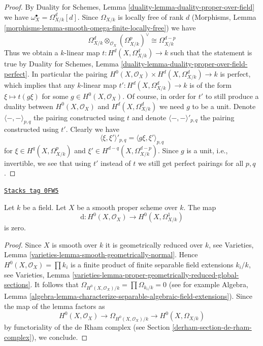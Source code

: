 \begin{proof}
By Duality for Schemes, Lemma \ref{duality-lemma-duality-proper-over-field}
we have $\omega_X^\bullet = \Omega^d_{X/k}[d]$.
Since $\Omega_{X/k}$ is locally free of rank $d$
(Morphisms, Lemma \ref{morphisms-lemma-smooth-omega-finite-locally-free})
we have
$$
\Omega^d_{X/k} \otimes_{\mathcal{O}_X} (\Omega^p_{X/k})^\vee
\cong
\Omega^{d - p}_{X/k}
$$
Thus we obtain a $k$-linear map $t : H^d(X, \Omega^d_{X/k}) \to k$
such that the statement is true by Duality for Schemes, Lemma
\ref{duality-lemma-duality-proper-over-field-perfect}.
In particular the pairing
$H^0(X, \mathcal{O}_X) \times H^d(X, \Omega^d_{X/k}) \to k$
is perfect, which implies that any $k$-linear map
$t' : H^d(X, \Omega^d_{X/k}) \to k$ is of the form
$\xi \mapsto t(g\xi)$ for some $g \in H^0(X, \mathcal{O}_X)$.
Of course, in order for $t'$ to still produce a duality
between $H^0(X, \mathcal{O}_X)$ and $H^d(X, \Omega^d_{X/k})$
we need $g$ to be a unit. Denote $\langle -, - \rangle_{p, q}$
the pairing constructed using $t$ and denote $\langle -, - \rangle'_{p, q}$
the pairing constructed using $t'$. Clearly we have
$$
\langle \xi, \xi' \rangle'_{p, q} =
\langle g\xi, \xi' \rangle_{p, q}
$$
for $\xi \in H^q(X, \Omega^p_{X/k})$ and
$\xi' \in H^{d - q}(X, \Omega^{d - p}_{X/k})$. Since $g$ is a unit, i.e.,
invertible, we see that using $t'$ instead of $t$ we still get perfect
pairings for all $p, q$.
\end{proof}

\begin{lemma}
\label{derham-lemma-bottom-part-degenerates}
\href{https://stacks.math.columbia.edu/tag/0FW5}{\texttt{Stacks tag 0FW5}}

Let $k$ be a field. Let $X$ be a smooth proper scheme over $k$. The map
$$
\text{d} : H^0(X, \mathcal{O}_X) \to H^0(X, \Omega^1_{X/k})
$$
is zero.
\end{lemma}

\begin{proof}
Since $X$ is smooth over $k$ it is geometrically reduced over $k$, see
Varieties, Lemma \ref{varieties-lemma-smooth-geometrically-normal}.
Hence $H^0(X, \mathcal{O}_X) = \prod k_i$
is a finite product of finite separable
field extensions $k_i/k$, see Varieties, Lemma
\ref{varieties-lemma-proper-geometrically-reduced-global-sections}.
It follows that $\Omega_{H^0(X, \mathcal{O}_X)/k} = \prod \Omega_{k_i/k} = 0$
(see for example Algebra, Lemma
\ref{algebra-lemma-characterize-separable-algebraic-field-extensions}).
Since the map of the lemma factors as
$$
H^0(X, \mathcal{O}_X) \to
\Omega_{H^0(X, \mathcal{O}_X)/k} \to
H^0(X, \Omega_{X/k})
$$
by functoriality of the de Rham complex
(see Section \ref{derham-section-de-rham-complex}), we conclude.
\end{proof}

